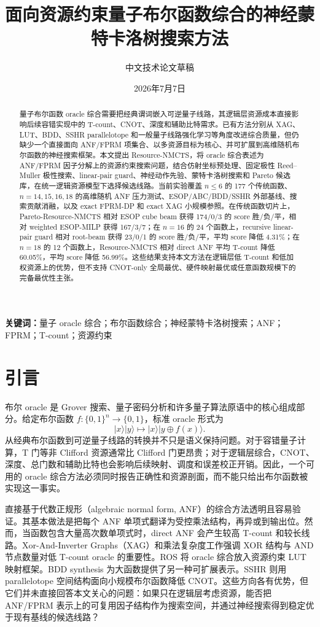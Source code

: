 \documentclass[UTF8,fontset=macnew,11pt]{ctexart}
\title{面向资源约束量子布尔函数综合的神经蒙特卡洛树搜索方法}
\author{中文技术论文草稿}
\date{2026年7月7日}
\newcommand{\method}{Resource-NMCTS}
\newcommand{\pareto}{Pareto-Resource-NMCTS}
\begin{document}
\maketitle

\begin{abstract}
量子布尔函数 oracle 综合需要把经典谓词嵌入可逆量子线路，其逻辑层资源成本直接影响后续容错实现中的 T-count、CNOT、深度和辅助比特需求。已有方法分别从 XAG、LUT、BDD、SSHR parallelotope 和一般量子线路强化学习等角度改进综合质量，但仍缺少一个直接面向 ANF/FPRM 项集合、以多资源目标为核心、并可扩展到高维随机布尔函数的神经搜索框架。本文提出 \method{}，将 oracle 综合表述为 ANF/FPRM 因子分解上的资源约束搜索问题，结合仿射坐标预处理、固定极性 Reed--Muller 极性搜索、linear-pair guard、神经动作先验、蒙特卡洛树搜索和 Pareto 候选库，在统一逻辑资源模型下选择候选线路。当前实验覆盖 $n\leq 6$ 的 177 个传统函数、$n=14,15,16,18$ 的高维随机 ANF 压力测试、ESOP/ABC/BDD/SSHR 外部基线、搜索贡献消融，以及 exact FPRM-DP 和 exact XAG 小规模参照。在传统函数切片上，\pareto{} 相对 ESOP cube beam 获得 174/0/3 的 score 胜/负/平，相对 weighted ESOP-MILP 获得 167/3/7；在 $n=16$ 的 24 个函数上，recursive linear-pair guard 相对 root-beam 获得 23/0/1 的 score 胜/负/平，平均 score 降低 4.31\%；在 $n=18$ 的 12 个函数上，\method{} 相对 direct ANF 平均 T-count 降低 60.05\%，平均 score 降低 56.99\%。这些结果支持本文方法在逻辑层低 T-count 和低加权资源上的优势，但不支持 CNOT-only 全局最优、硬件映射最优或任意函数规模下的完备最优性主张。
\end{abstract}

\noindent\textbf{关键词：}量子 oracle 综合；布尔函数综合；神经蒙特卡洛树搜索；ANF；FPRM；T-count；资源约束

\section{引言}

布尔 oracle 是 Grover 搜索、量子密码分析和许多量子算法原语中的核心组成部分。给定布尔函数 $f:\{0,1\}^{n}\rightarrow\{0,1\}$，标准 oracle 形式为
\begin{equation}
  |x\rangle|y\rangle\mapsto |x\rangle|y\oplus f(x)\rangle .
\end{equation}
从经典布尔函数到可逆量子线路的转换并不只是语义保持问题。对于容错量子计算，T 门等非 Clifford 资源通常比 Clifford 门更昂贵；对于逻辑层综合，CNOT、深度、总门数和辅助比特也会影响后续映射、调度和误差校正开销。因此，一个可用的 oracle 综合方法必须同时报告正确性和资源剖面，而不能只给出布尔函数被实现这一事实。

直接基于代数正规形（algebraic normal form, ANF）的综合方法透明且容易验证。其基本做法是把每个 ANF 单项式翻译为受控乘法结构，再异或到输出位。然而，当函数包含大量高次数单项式时，direct ANF 会产生较高 T-count 和较长线路。Xor-And-Inverter Graphs（XAG）和乘法复杂度工作强调 XOR 结构与 AND 节点数量对低 T-count oracle 的重要性\cite{meuli2022xag,meuli2019multiplicative}。ROS 将 oracle 综合放入资源约束 LUT 映射框架\cite{meuli2020ros}。BDD synthesis 为大函数提供了另一种可扩展表示\cite{wille2009bdd}。SSHR 则用 parallelotope 空间结构面向小规模布尔函数降低 CNOT\cite{zheng2025sshr}。这些方向各有优势，但它们并未直接回答本文关心的问题：如果只在逻辑层考虑资源，能否把 ANF/FPRM 表示上的可复用因子结构作为搜索空间，并通过神经搜索得到稳定优于现有基线的候选线路？
\end{document}
